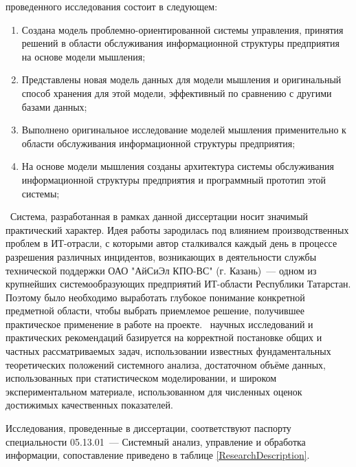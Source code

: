 \novelty проведенного исследования состоит в следующем:
\begin{enumerate}
  \item Создана модель проблемно-ориентированной системы управления, принятия решений в области обслуживания информационной структуры предприятия на основе модели мышления;
  \item Представлены новая модель данных для модели мышления и оригинальный способ хранения для этой модели, эффективный по сравнению с другими базами данных;
  \item Выполнено оригинальное исследование моделей мышления применительно к области обслуживания информационной структуры предприятия;
  \item На основе модели мышления созданы архитектура системы обслуживания информационной структуры предприятия и программный прототип этой системы;
\end{enumerate}

\influence\ 
Система, разработанная в рамках данной диссертации носит значимый практический характер. Идея работы зародилась под влиянием производственных проблем в ИТ-отрасли, с которыми автор сталкивался каждый день в процессе разрешения различных инцидентов, возникающих в деятельности службы технической поддержки ОАО "АйСиЭл КПО-ВС" (г. Казань)~--- одном из крупнейших системообразующих предприятий ИТ-области Республики Татарстан. Поэтому было необходимо выработать глубокое понимание конкретной предметной области, чтобы выбрать  приемлемое решение, получившее практическое применение в работе на проекте. 
\reliability\ научных исследований и практических рекомендаций
базируется на корректной постановке общих и частных рассматриваемых задач,  использовании известных фундаментальных теоретических положений
системного анализа, достаточном объёме данных, использованных при статистическом моделировании, и широком экспериментальном материале, использованном для численных оценок
достижимых качественных показателей. \par 
Исследования, проведенные в диссертации, соответствуют паспорту специальности 05.13.01~--- Системный анализ, управление и обработка информации, сопоставление приведено в таблице \ref{ResearchDescription}.

